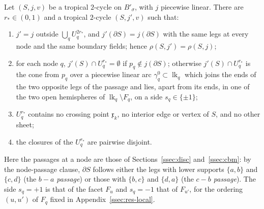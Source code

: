 \begin{lemma}\label{lem:NS}
Let $(S,j,v)$ be a tropical $2$-cycle on $B'_\sigma$, with $j$ piecewise linear. There are $r_*\in(0,1)$ and a tropical
$2$-cycle $(S,j',v)$ such that:
\begin{enumerate}
\item[(0)] $j'=j$ outside $\bigcup_qU_q^{2r_*}$, and $j'(\partial S)=j(\partial S)$ with the same legs at every node and the
same boundary fields; hence $\rho(S,j')=\rho(S,j)$;
\item[(1)] for each node $q$, $j'(S)\cap U^{r_*}_q=\emptyset$ if $p_q\notin j(\partial S)$; otherwise $j'(S)\cap U^{r_*}_q$ is
the cone from $p_q$ over a piecewise linear arc $\gamma^0_q\subset\operatorname{lk}_q$ which joins the ends of the two
opposite legs of the passage and lies, apart from its ends, in one of the two open hemispheres of
$\operatorname{lk}_q\setminus F_q$, on a side $s_q\in\{\pm1\}$;
\item[(2)] $U^{r_*}_q$ contains no crossing point $\mathfrak x_k$, no interior edge or vertex of $S$, and no other sheet;
\item[(3)] the closures of the $U^{r_*}_q$ are pairwise disjoint.
\end{enumerate}
\end{lemma}
Here the passages at a node are those of Sections~\ref{ssec:disc} and~\ref{ssec:cbm}: by the node-passage clause, $\partial S$ follows either the legs
with lower supports $\{a,b\}$ and $\{c,d\}$ (the \emph{$b-a$ passage}) or those with $\{b,c\}$ and $\{d,a\}$ (the
\emph{$c-b$ passage}). The side $s_q=+1$ is that of the facet $F_{u}$ and $s_q=-1$ that of $F_{u'}$,
for the ordering $(u,u')$ of $F_q$ fixed in Appendix~\ref{ssec:res-local}.
